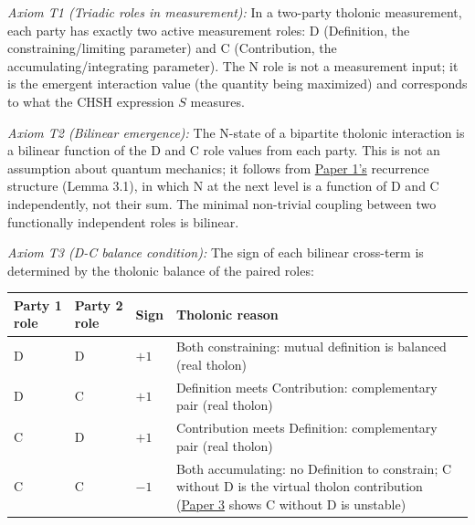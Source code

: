 \documentclass[
  11pt,
  letterpaper,
]{article}
\begin{document}
\emph{Axiom T1 (Triadic roles in measurement):} In a two-party tholonic
measurement, each party has exactly two active measurement roles: D
(Definition, the constraining/limiting parameter) and C (Contribution,
the accumulating/integrating parameter). The N role is not a measurement
input; it is the emergent interaction value (the quantity being
maximized) and corresponds to what the CHSH expression \(S\) measures.

\emph{Axiom T2 (Bilinear emergence):} The N-state of a bipartite
tholonic interaction is a bilinear function of the D and C role values
from each party. This is not an assumption about quantum mechanics; it
follows from
\href{https://github.com/baardev/truevalue/blob/main/docnav/Research/papers/1_recursive-tholonic-five-constants/1_recursive-tholonic-five-constants.pdf}{Paper
1's} recurrence structure (Lemma 3.1), in which N at the next level is a
function of D and C independently, not their sum. The minimal
non-trivial coupling between two functionally independent roles is
bilinear.

\emph{Axiom T3 (D-C balance condition):} The sign of each bilinear
cross-term is determined by the tholonic balance of the paired roles:

\begin{longtable}[]{@{}
  >{\centering\arraybackslash}p{}
  >{\centering\arraybackslash}p{}
  >{\centering\arraybackslash}p{}
  >{\raggedright\arraybackslash}p{}@{}}
\toprule\noalign{}
\begin{minipage}[b]{\linewidth}\centering
Party 1 role
\end{minipage} & \begin{minipage}[b]{\linewidth}\centering
Party 2 role
\end{minipage} & \begin{minipage}[b]{\linewidth}\centering
Sign
\end{minipage} & \begin{minipage}[b]{\linewidth}\raggedright
Tholonic reason
\end{minipage} \\
\midrule\noalign{}
\endhead
\bottomrule\noalign{}
\endlastfoot
D & D & \(+1\) & Both constraining: mutual definition is balanced (real
tholon) \\
D & C & \(+1\) & Definition meets Contribution: complementary pair (real
tholon) \\
C & D & \(+1\) & Contribution meets Definition: complementary pair (real
tholon) \\
C & C & \(-1\) & Both accumulating: no Definition to constrain; C
without D is the virtual tholon contribution
(\href{https://github.com/baardev/truevalue/blob/main/docnav/Research/papers/3_minimal-recursive-triadic-framework/3_minimal-recursive-triadic-framework.pdf}{Paper
3} shows C without D is unstable) \\
\end{longtable}
\end{document}
